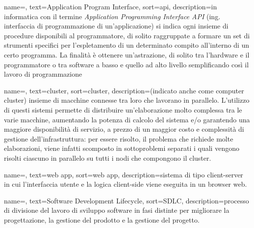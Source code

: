 
\renewcommand{\acronymname}{Acronimi e abbreviazioni}




{
    name=,
    text=Application Program Interface,
    sort=api,
    description={in informatica con il termine \emph{Application Programming Interface API} (ing. interfaccia di programmazione di un'applicazione) si indica ogni insieme di procedure disponibili al programmatore, di solito raggruppate a formare un set di strumenti specifici per l'espletamento di un determinato compito all'interno di un certo programma. La finalità è ottenere un'astrazione, di solito tra l'hardware e il programmatore o tra software a basso e quello ad alto livello semplificando così il lavoro di programmazione}
}

{
    name=,
    text=cluster,
    sort=cluster,
    description={(indicato anche come computer cluster) insieme di macchine connesse tra loro che lavorano in parallelo.
    L'utilizzo di questi sistemi permette di distribuire un'elaborazione molto complessa tra le varie macchine, aumentando la potenza di calcolo del sistema e/o garantendo una maggiore disponibilità di servizio, a prezzo di un maggior costo e complessità di gestione dell'infrastruttura: per essere risolto, il problema che richiede molte elaborazioni, viene infatti scomposto in sottoproblemi separati i quali vengono risolti ciascuno in parallelo su tutti i nodi che compongono il cluster.}
}

{
	name=,
	text=web app,
	sort=web app,
	description={sistema di tipo client-server in cui l'interfaccia utente e la logica client-side viene eseguita in un browser web.}
}

{
	name=,
	text=Software Development Lifecycle,
	sort=SDLC,
	description={processo di divisione del lavoro di sviluppo software in fasi distinte per migliorare la progettazione, la gestione del prodotto e la gestione del progetto.}
}

